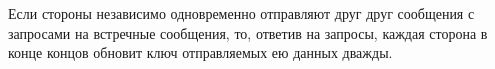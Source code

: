 
\begin{note}
Если стороны независимо одновременно отправляют друг друг сообщения 
 с запросами на встречные сообщения, то, ответив на запросы, 
каждая сторона в конце концов обновит ключ отправляемых ею данных дважды.
\end{note}

